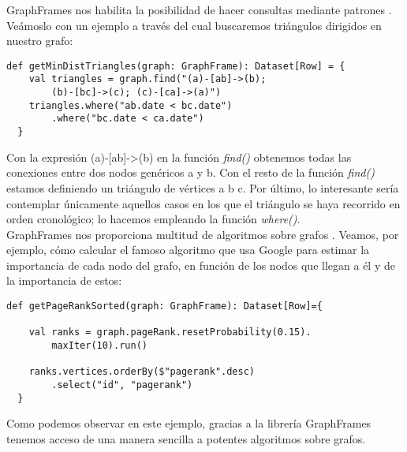 GraphFrames nos habilita la posibilidad de hacer consultas mediante patrones \cite{motif}. Veámoslo con un ejemplo a través del cual buscaremos triángulos dirigidos en nuestro grafo:\\

\begin{lstlisting}[frame=single]
  def getMinDistTriangles(graph: GraphFrame): Dataset[Row] = {
    val triangles = graph.find("(a)-[ab]->(b); 
    	(b)-[bc]->(c); (c)-[ca]->(a)")
    triangles.where("ab.date < bc.date")
    	.where("bc.date < ca.date")
  }
\end{lstlisting}

Con la expresión (a)-[ab]->(b) en la función \textit{find()} obtenemos todas las conexiones entre dos nodos genéricos a y b. Con el resto de la función \textit{find()} estamos definiendo un triángulo de vértices a b c.  Por último, lo interesante sería contemplar únicamente aquellos casos en los que el triángulo se haya recorrido en orden cronológico; lo hacemos empleando la función \textit{where()}.\\

GraphFrames nos proporciona multitud de algoritmos sobre grafos \cite{graphFramesGuide}. Veamos, por ejemplo, cómo calcular el famoso algoritmo que usa Google \cite{pagerank} para estimar la importancia de cada nodo del grafo, en función de los nodos que llegan a él y de la importancia de estos:\\

\begin{lstlisting}[frame=single]
  def getPageRankSorted(graph: GraphFrame): Dataset[Row]={

    val ranks = graph.pageRank.resetProbability(0.15).
    	maxIter(10).run()

	ranks.vertices.orderBy($"pagerank".desc)
		.select("id", "pagerank")
  }
\end{lstlisting}

Como podemos observar en este ejemplo, gracias a la librería GraphFrames tenemos acceso de una manera sencilla a potentes algoritmos sobre grafos.\\
